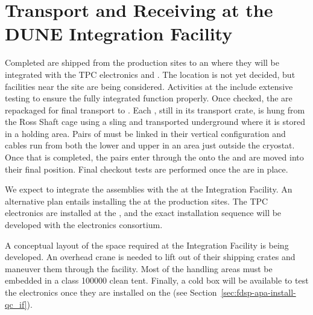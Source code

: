 \section{Transport and Receiving at the DUNE Integration Facility}
\label{sec:fdsp-apa-install}

Completed  are shipped from the  production sites to an  where they will be integrated with the TPC  electronics and .  The  location is not yet decided, but facilities near the \surf site are being considered.   Activities at the   include extensive  testing to ensure the fully integrated  function properly.  Once checked, the  are repackaged for final transport to \surf. Each , still in its transport crate, is hung from the Ross Shaft cage using a sling and transported underground where it is stored in a holding area.  Pairs of  must be linked in their vertical configuration and cables run from both the lower and upper  in an area just outside the cryostat.  Once that is completed, the pairs enter through the  onto the  and are moved into their final position.  Final checkout tests are performed once the  are in place.

We expect to integrate the assemblies with the  at the Integration Facility. %
An alternative plan entails installing the  at the  production sites. The TPC  electronics are installed  at the , and the exact installation sequence will be developed with the electronics consortium.

A conceptual layout of the space required at the Integration Facility is being developed. An overhead crane is needed to lift  out of their shipping crates and maneuver them through the facility.  Most of the handling areas must be embedded in a class \num{100000} clean tent. Finally, a cold box will be available to test the  electronics once they are installed on the  (see Section~\ref{sec:fdsp-apa-install-qc_if}).  



